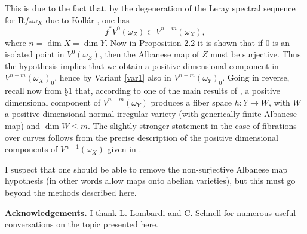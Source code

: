 \documentclass{amsart}
\theoremstyle{plain}
\theoremstyle{definition}
\numberwithin{equation}{section}
\begin{document}
This is due to the fact that, by the degeneration of the Leray spectral sequence for ${\mathbf{R}} f_* \omega_X$ 
due to Koll\'ar \cite{kollar1}, one has 
$$f^* V^0 (\omega_Z) \subset V^{n - m} (\omega_X),$$ 
where $n = \dim X = \dim Y$.
Now in \cite{EL} Proposition 2.2 it is shown that if $0$ is an isolated point in $V^0 (\omega_Z)$, then
the Albanese map of $Z$ must be surjective. Thus the hypothesis implies that we obtain a positive 
dimensional component in $V^{n - m} (\omega_X)_0$, hence by Variant \ref{var1} also in 
$V^{n - m} (\omega_Y)_0$. Going in reverse, 
recall now from \S1 that, according to one of the main results of 
\cite{GL2}, a positive dimensional component of $V^{n- m} (\omega_Y)$ produces a fiber space 
$h: Y\rightarrow W$,  
with $W$ a positive dimensional normal irregular variety (with generically finite Albanese map) and $\dim W \le m$. 
The slightly stronger statement in the case of fibrations over curves follows from the precise description of the positive 
dimensional components of $V^{n-1} (\omega_X)$ given in \cite{beauville3}.

I suspect that one should be able to remove the non-surjective Albanese map hypothesis (in other
words allow maps onto abelian varieties), but this must go beyond the methods described here.

\noindent
{\bf Acknowledgements.} 
I thank L. Lombardi and C. Schnell for numerous useful conversations on the topic presented here.

\providecommand{\bysame}{\leavevmode\hbox
to3em{\hrulefill}\thinspace}
\end{document}
